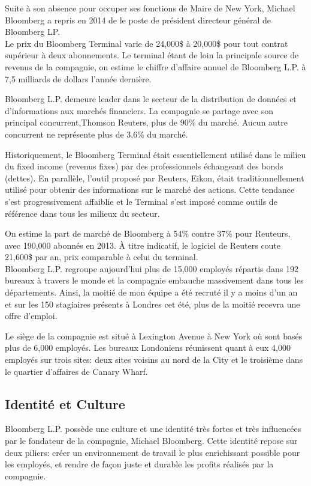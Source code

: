\documentclass[11pt, oneside, titlepage, a4paper]{article}
\begin{document}
Suite à son absence pour occuper ses fonctions de Maire de New York, Michael Bloomberg a repris en 2014 de le poste de président directeur général de Bloomberg LP.
\\

Le prix du Bloomberg Terminal varie de 24,000\$ à 20,000\$ pour tout contrat supérieur à deux abonnements. Le terminal étant de loin la principale source de revenus de la compagnie, on estime le chiffre d'affaire annuel de Bloomberg L.P. à 7,5 milliards de dollars l'année dernière.

Bloomberg L.P. demeure leader dans le secteur de la distribution de données et d'informations aux marchés financiers. La compagnie se partage avec son principal concurrent,Thomson Reuters, plus de 90\% du marché. Aucun autre concurrent ne représente plus de 3,6\% du marché.

Historiquement, le Bloomberg Terminal était essentiellement utilisé dans le milieu du fixed income (revenus fixes) par des professionnels échangeant des bonds (dettes). En parallèle, l'outil proposé par Reuters, Eikon, était traditionnellement utilisé pour obtenir des informations sur le marché des actions. Cette tendance s'est progressivement affaiblie et le Terminal s'est imposé comme outils de référence dans tous les milieux du secteur.

On estime la part de marché de Bloomberg à 54\% contre 37\% pour Reuteurs, avec 190,000 abonnés en 2013. À titre indicatif, le logiciel de Reuters coute 21,600\$ par an, prix comparable à celui du terminal.
\\

Bloomberg L.P. regroupe aujourd'hui plus de 15,000 employés répartis dans 192 bureaux à travers le monde et la compagnie embauche massivement dans tous les départements. Ainsi, la moitié de mon équipe a été recruté il y a moins d'un an et sur les 150 stagiaires présents à Londres cet été, plus de la moitié recevra une offre d'emploi.

Le siège de la compagnie est situé à Lexington Avenue à New York où sont basés plus de 6,000 employés. Les bureaux Londoniens réunissent quant à eux 4,000 employés sur trois sites: deux sites voisins au nord de la City et le troisième dans le quartier d'affaires de Canary Wharf.
	\subsection{Identité et Culture}
Bloomberg L.P. possède une culture et une identité très fortes et très influencées par le fondateur de la compagnie, Michael Bloomberg. Cette identité repose sur deux piliers: créer un environnement de travail le plus enrichissant possible pour les employés, et rendre de façon juste et durable les profits réalisés par la compagnie.
\end{document}
